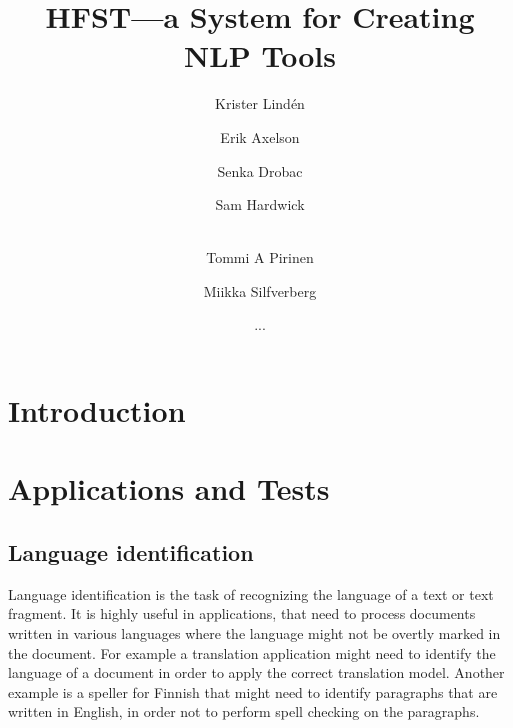 \documentclass{llncs}
\begin{document}
%
\title{HFST---a System for Creating NLP Tools}
%
\author{Krister Lind\'{e}n \and Erik Axelson \and Senka Drobac \and Sam Hardwick \and\\
Tommi A Pirinen \and Miikka Silfverberg \and ...}


\maketitle


\begin{abstract}
\end{abstract}


\section*{Introduction}

\section{Applications and Tests}\label{hfst:structural-layout}

\subsection{Language identification}
Language identification is the task of recognizing the language of a
text or text fragment. It is highly useful in applications, that need
to process documents written in various languages where the language
might not be overtly marked in the document. For example a translation
application might need to identify the language of a document in order
to apply the correct translation model. Another example is a speller for
Finnish that might need to identify paragraphs that are written in
English, in order not to perform spell checking on the paragraphs.
\end{document}
